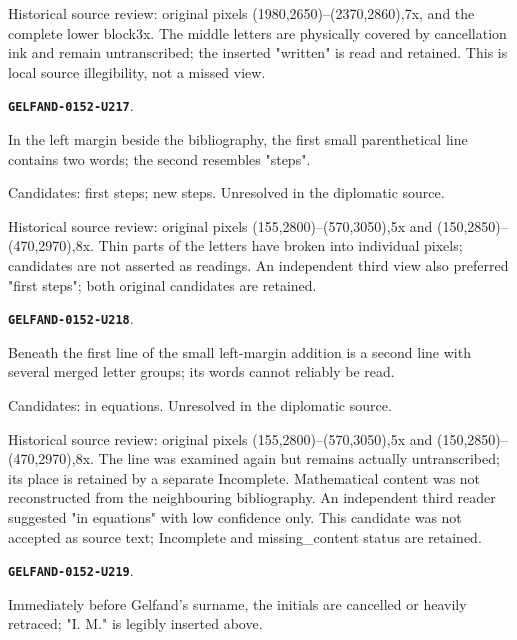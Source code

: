 \documentclass[11pt]{article}
\theoremstyle{definition}
\theoremstyle{remark}
\begin{document}
Historical source review: original pixels (1980,2650)–(2370,2860),7x, and the complete lower block3x. The middle letters are physically covered by cancellation ink and remain untranscribed; the inserted "written" is read and retained. This is local source illegibility, not a missed view.\par\medskip
\par\noindent\leavevmode{}\label{GELFAND-0152-U217}\label{GELFAND-P001400:margin-first-line:note}\textbf{\texttt{GELFAND-0152-U217}}.\nopagebreak[4]\par
In the left margin beside the bibliography, the first small parenthetical line contains two words; the second resembles "steps".\par
Candidates: first steps; new steps. Unresolved in the diplomatic source.\par
Historical source review: original pixels (155,2800)–(570,3050),5x and (150,2850)–(470,2970),8x. Thin parts of the letters have broken into individual pixels; candidates are not asserted as readings. An independent third view also preferred "first steps"; both original candidates are retained.\par\medskip
\par\noindent\leavevmode{}\label{GELFAND-0152-U218}\label{GELFAND-P001400:margin-second-line:note}\textbf{\texttt{GELFAND-0152-U218}}.\nopagebreak[4]\par
Beneath the first line of the small left-margin addition is a second line with several merged letter groups; its words cannot reliably be read.\par
Candidates: in equations. Unresolved in the diplomatic source.\par
Historical source review: original pixels (155,2800)–(570,3050),5x and (150,2850)–(470,2970),8x. The line was examined again but remains actually untranscribed; its place is retained by a separate Incomplete. Mathematical content was not reconstructed from the neighbouring bibliography. An independent third reader suggested "in equations" with low confidence only. This candidate was not accepted as source text; Incomplete and missing\_content status are retained.\par\medskip
\par\noindent\leavevmode{}\label{GELFAND-0152-U219}\label{GELFAND-P001400:bibliography-cancelled-initials:note}\textbf{\texttt{GELFAND-0152-U219}}.\nopagebreak[4]\par
Immediately before Gelfand's surname, the initials are cancelled or heavily retraced; "I. M." is legibly inserted above.\par
\end{document}

